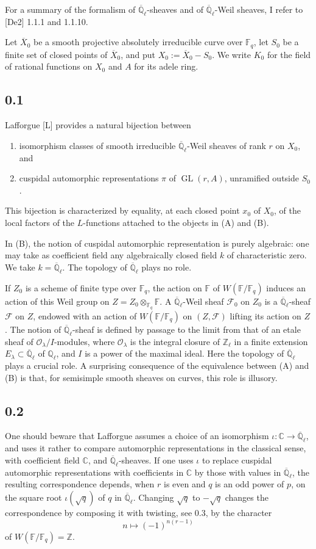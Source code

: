 \documentclass[10pt]{article}
\newcommand{\F}{\mathbb{F}}
\newcommand{\Z}{\mathbb{Z}}
\newcommand{\Ql}{\overline{\mathbb Q}_{\ell}}
\newcommand{\GL}{\operatorname{GL}}
\begin{document}
For a summary of the formalism of $\Ql$-sheaves and of $\Ql$-Weil sheaves, I refer to [De2] 1.1.1 and 1.1.10.

Let $\overline X_0$ be a smooth projective absolutely irreducible curve over $\F_q$, let $S_0$ be a finite set of closed points of $\overline X_0$, and put $X_0:=\overline X_0-S_0$.
We write $K_0$ for the field of rational functions on $X_0$ and $A$ for its adele ring.

\subsection*{0.1}
Lafforgue [L] provides a natural bijection between
\begin{enumerate}[label=(\Alph*)]
\item isomorphism classes of smooth irreducible $\Ql$-Weil sheaves of rank $r$ on $X_0$, and
\item cuspidal automorphic representations $\pi$ of $\GL(r,A)$, unramified outside $S_0$.
\end{enumerate}
This bijection is characterized by equality, at each closed point $x_0$ of $X_0$, of the local factors of the $L$-functions attached to the objects in (A) and (B).

In (B), the notion of cuspidal automorphic representation is purely algebraic: one may take as coefficient field any algebraically closed field $k$ of characteristic zero. We take $k=\Ql$. The topology of $\Ql$ plays no role.

If $Z_0$ is a scheme of finite type over $\F_q$, the action on $\F$ of $W(\F/\F_q)$ induces an action of this Weil group on $Z=Z_0\otimes_{\F_q}\F$.
A $\Ql$-Weil sheaf $\mathcal F_0$ on $Z_0$ is a $\Ql$-sheaf $\mathcal F$ on $Z$, endowed with an action of $W(\F/\F_q)$ on $(Z,\mathcal F)$ lifting its action on $Z$.
The notion of $\Ql$-sheaf is defined by passage to the limit from that of an etale sheaf of $\mathcal O_\lambda/I$-modules, where $\mathcal O_\lambda$ is the integral closure of $\mathbb Z_\ell$ in a finite extension $E_\lambda\subset\Ql$ of $\mathbb Q_\ell$, and $I$ is a power of the maximal ideal.
Here the topology of $\Ql$ plays a crucial role.
A surprising consequence of the equivalence between (A) and (B) is that, for semisimple smooth sheaves on curves, this role is illusory.

\subsection*{0.2}
One should beware that Lafforgue assumes a choice of an isomorphism $\iota:\mathbb C\to\Ql$, and uses it rather to compare automorphic representations in the classical sense, with coefficient field $\mathbb C$, and $\Ql$-sheaves.
If one uses $\iota$ to replace cuspidal automorphic representations with coefficients in $\mathbb C$ by those with values in $\Ql$, the resulting correspondence depends, when $r$ is even and $q$ is an odd power of $p$, on the square root $\iota(\sqrt q)$ of $q$ in $\Ql$.
Changing $\sqrt q$ to $-\sqrt q$ changes the correspondence by composing it with twisting, see 0.3, by the character
\[
 n\longmapsto (-1)^{n(r-1)}
\]
of $W(\F/\F_q)=\Z$.
\end{document}
